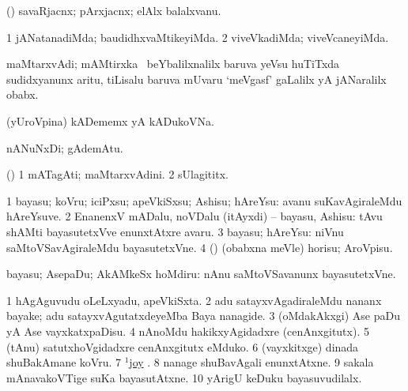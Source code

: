 \bentry
{}
\gl{\nA}
\bmng
(\AmA) savaRjacnx; pArxjacnx; elAlx balalxvanu. 
\emng
\eentry

\bentry
{}
\gl{\kirxvi}
\bmng
\bnum
\num{1} jANatanadiMda; baudidhxvaMtikeyiMda. 
\num{2} viveVkadiMda; viveVcaneyiMda. 
\enum
\emng
\eentry

\bentry
{}
\gl{\nA}
\bmng
maMtarxvAdi; mAMtirxka \eng{[} \kanmu\ beYbalilxnalilx baruva yeVsu huTiTxda sudidxyanunx aritu, tiLisalu baruva mUvaru `meVgasf' gaLalilx yA jANaralilx obabx\eng{]}. 
\emng
\eentry

\bentry
{}
\gl{\nA}
\bmng
(yUroVpina) kADememx yA kADukoVNa. 
\emng
\eentry

\bentry
{}
\gl{\nA}
\bmng
nANuNxDi; gAdemAtu. 
\emng
\eentry

\bentry
{}
\gl{\nA}
\bmng
(\birx) 
\bnum
\num{1} mATagAti; maMtarxvAdini. 
\num{2} sUlagititx. 
\enum
\emng
\eentry

\bentry
{} 
\gl{\sakirx}
\bmng
\bnum
\num{1} bayasu; koVru; iciPxsu; apeVkiSxsu; Ashisu; hAreYsu:  avanu suKavAgiraleMdu hAreYsuve. 
\num{2} EnanenxV mADalu, noVDalu (itAyxdi) -- bayasu, Ashisu:  tAvu shAMti bayasutetxVve enunxtAtxre avaru. 
\num{3} bayasu; hAreYsu:  niVnu saMtoVSavAgiraleMdu bayasutetxVne. 
\num{4} (\AmA) (obabxna meVle) horisu; AroVpisu. 
\enum
\emng

\noindent 
\gl{\akirx}
\bmng
bayasu; AsepaDu; AkAMkeSx hoMdiru:  nAnu saMtoVSavanunx bayasutetxVne. 
\emng

\noindent 
\gl{\pagu}
\bmng
\bnum
\num{1}  hAgAguvudu oLeLxyadu, apeVkiSxta. 
\num{2}  adu satayxvAgadiraleMdu nananx bayake; adu satayxvAgutatxdeyeMba Baya nanagide. 
\num{3}  (oMdakAkxgi) Ase paDu yA Ase vayxkatxpaDisu. 
\num{4}  nAnoMdu hakikxyAgidadxre (cenAnxgitutx). 
\num{5}  (tAnu) satutxhoVgidadxre cenAnxgitutx eMduko. 
\num{6}  (vayxkitxge) dinada shuBakAmane koVru. 
\num{7}  \hyperref{kandict_j.pdf}{J}{joy(1) nuga}{$^1$joy} . 
\num{8}  nanage shuBavAgali enunxtAtxne. 
\num{9}  sakala mAnavakoVTige suKa bayasutAtxne. 
\num{10}  yArigU keDuku bayasuvudilalx. 
\enum
\emng
\eentry

